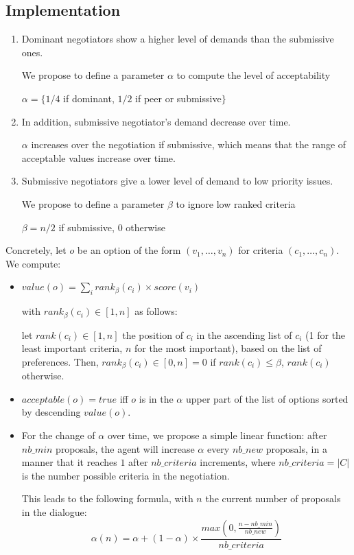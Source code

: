 \documentclass{llncs}
\begin{document}
\subsection{Implementation}
\begin{enumerate}
	\item Dominant negotiators show a higher level of demands than the submissive ones.
	
	We propose to define a parameter $\alpha$ to compute the level of acceptability
	
	$\alpha = \{ 1/4$ if dominant, $1/2$ if peer or submissive$\}$ 
	
	\item In addition, submissive negotiator's demand decrease over time. 
	
	$ \alpha$ increases over the negotiation if submissive, which means that the range of acceptable values increase over time.
	
	\item Submissive negotiators give a lower level of demand to low priority issues.
	
	We propose to define a parameter $\beta$ to ignore low ranked criteria 
	
	$\beta = n/2$ if submissive, $0$ otherwise
\end{enumerate}

Concretely, let $o$ be an option of the form $(v_1,\ldots,v_n)$ for criteria $(c_1,\ldots,c_n)$. We compute:
\begin{itemize}
	\item $value(o) = \sum_i rank_\beta(c_i)\times score(v_i)$
	
	with $rank_\beta(c_i)\in[1,n]$ as follows:
	
	let $rank(c_i)\in[1,n]$ the position of $c_i$ in the ascending list of $c_i$ (1 for the least important criteria, $n$ for the most important), based on the list of preferences. Then, $rank_\beta(c_i)\in[0,n] = 0$ if $rank(c_i)\leq \beta$, $rank(c_i)$ otherwise.
	
	\item $acceptable(o) = true$ iff $o$ is in the $\alpha$ upper part of the list of options sorted by descending $value(o)$.
	\item For the change of $\alpha$ over time, we propose a simple linear function: after $nb\_min$ proposals, the agent will increase $\alpha$ every $nb\_new$ proposals, in a manner that it reaches $1$ after $nb\_criteria$ increments, where $nb\_criteria = |C|$ is the number possible criteria in the negotiation.
	
	This leads to the following formula, with $n$ the current number of proposals in the dialogue:
	$$\alpha(n) = \alpha + (1-\alpha)\times\frac{max(0,\frac{n-nb\_min}{nb\_new})}{nb\_criteria}$$
\end{itemize}
\end{document}
